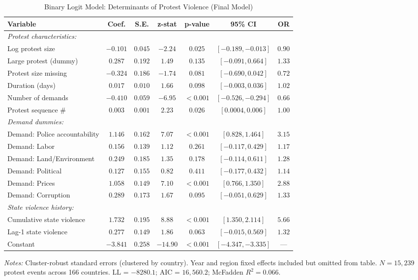 \documentclass[11pt,a4paper]{article}
\begin{document}
\begin{table}[ht!]
\centering
\caption{Binary Logit Model: Determinants of Protest Violence (Final Model)}
\label{tab:main}
\scriptsize
\begin{tabular}{lcccccc}
\toprule
\textbf{Variable} & \textbf{Coef.} & \textbf{S.E.} & \textbf{z-stat} & \textbf{p-value} & \textbf{95\% CI} & \textbf{OR} \\
\midrule
\multicolumn{7}{l}{\textit{Protest characteristics:}} \\
Log protest size & $-0.101$ & $0.045$ & $-2.24$ & $0.025$ & $[-0.189, -0.013]$ & $0.90$ \\
Large protest (dummy) & $0.287$ & $0.192$ & $1.49$ & $0.135$ & $[-0.091, 0.664]$ & $1.33$ \\
Protest size missing & $-0.324$ & $0.186$ & $-1.74$ & $0.081$ & $[-0.690, 0.042]$ & $0.72$ \\
Duration (days) & $0.017$ & $0.010$ & $1.66$ & $0.098$ & $[-0.003, 0.036]$ & $1.02$ \\
Number of demands & $-0.410$ & $0.059$ & $-6.95$ & $< 0.001$ & $[-0.526, -0.294]$ & $0.66$ \\
Protest sequence \# & $0.003$ & $0.001$ & $2.23$ & $0.026$ & $[0.0004, 0.006]$ & $1.00$ \\
\midrule
\multicolumn{7}{l}{\textit{Demand dummies:}} \\
Demand: Police accountability & $1.146$ & $0.162$ & $7.07$ & $< 0.001$ & $[0.828, 1.464]$ & $3.15$ \\
Demand: Labor & $0.156$ & $0.139$ & $1.12$ & $0.261$ & $[-0.117, 0.429]$ & $1.17$ \\
Demand: Land/Environment & $0.249$ & $0.185$ & $1.35$ & $0.178$ & $[-0.114, 0.611]$ & $1.28$ \\
Demand: Political & $0.127$ & $0.155$ & $0.82$ & $0.411$ & $[-0.177, 0.432]$ & $1.14$ \\
Demand: Prices & $1.058$ & $0.149$ & $7.10$ & $< 0.001$ & $[0.766, 1.350]$ & $2.88$ \\
Demand: Corruption & $0.289$ & $0.173$ & $1.67$ & $0.095$ & $[-0.051, 0.629]$ & $1.33$ \\
\midrule
\multicolumn{7}{l}{\textit{State violence history:}} \\
Cumulative state violence & $1.732$ & $0.195$ & $8.88$ & $< 0.001$ & $[1.350, 2.114]$ & $5.66$ \\
Lag-1 state violence & $0.277$ & $0.149$ & $1.86$ & $0.063$ & $[-0.015, 0.569]$ & $1.32$ \\
\midrule
Constant & $-3.841$ & $0.258$ & $-14.90$ & $< 0.001$ & $[-4.347, -3.335]$ & --- \\
\bottomrule
\end{tabular}
\footnotesize
\textit{Notes:} Cluster-robust standard errors (clustered by country). Year and region fixed effects included but omitted from table.
$N = 15,239$ protest events across 166 countries. LL = $-8280.1$; AIC = $16,560.2$; McFadden $R^2 = 0.066$.
\end{table}
\end{document}
